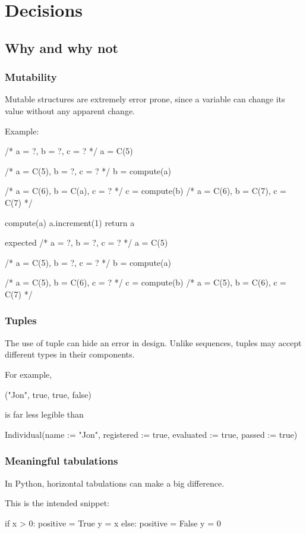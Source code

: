 \chapter{Decisions}

\section{Why and why not}

\subsection{Mutability}
Mutable structures are extremely error prone, since a variable can change its value without any apparent change.

Example:

/* a = ?, b = ?, c = ? */
a = C(5)

/* a = C(5), b = ?, c = ? */
b = compute(a)

/* a = C(6), b = C(a), c = ? */
c = compute(b)
/* a = C(6), b = C(7), c = C(7) */


compute(a)
a.increment(1)
return a


expected
/* a = ?, b = ?, c = ? */
a = C(5)

/* a = C(5), b = ?, c = ? */
b = compute(a)

/* a = C(5), b = C(6), c = ? */
c = compute(b)
/* a = C(5), b = C(6), c = C(7) */

\subsection{Tuples}

The use of tuple can hide an error in design.
Unlike sequences, tuples may accept different types in their components.

For example,

("Jon", true, true, false)

is far less legible than

Individual(name := "Jon", registered := true, evaluated := true, passed := true)

\subsection{Meaningful tabulations}

In Python, horizontal tabulations can make a big difference.

This is the intended snippet:

if x > 0:
positive = True
y = x
else:
positive = False
y = 0


